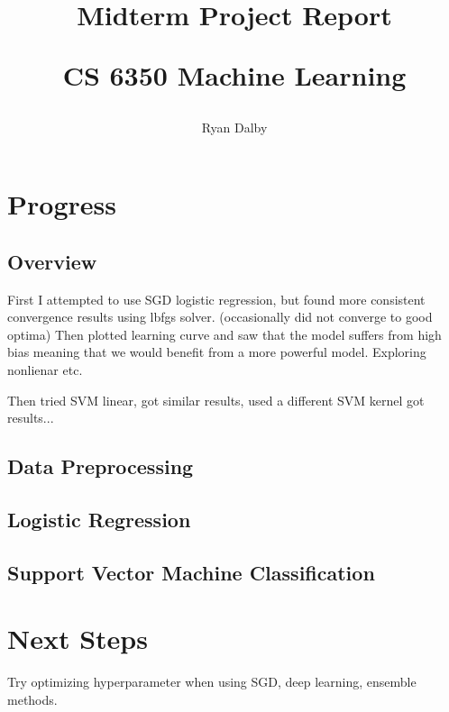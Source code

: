 \documentclass[11pt]{article}
\title{
    Midterm Project Report

    \large{
    CS 6350 Machine Learning
    }  
    
}
\author{
    Ryan Dalby
}
\date{\displaydate{date}}
\begin{document}
\maketitle

\section*{Progress}
\subsection*{Overview}
First I attempted to use SGD logistic regression, but found more consistent convergence results using lbfgs solver. (occasionally did not converge to good optima)
Then plotted learning curve and saw that the model suffers from high bias meaning that we would benefit from a more powerful model. Exploring nonlienar etc.

Then tried SVM linear, got similar results, used a different SVM kernel got results...  



\subsection*{Data Preprocessing}
\subsection*{Logistic Regression}
\subsection*{Support Vector Machine Classification}

\section*{Next Steps}
Try optimizing hyperparameter when using SGD, deep learning, ensemble methods.


% 
% 
\end{document}
